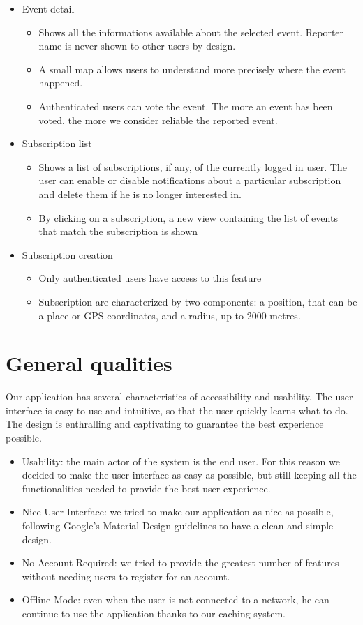 \documentclass[a4paper]{scrreprt}
\begin{document}
\begin{itemize}
\item Event detail
\begin{itemize}
\item Shows all the informations available about the selected event. Reporter name is never shown to other users by design.
\item A small map allows users to understand more precisely where the event happened.
\item Authenticated users can vote the event. The more an event has been voted, the more we consider reliable the reported event.
\end{itemize}

\item Subscription list
\begin{itemize}
\item Shows a list of subscriptions, if any, of the currently logged in user. The user can enable or disable notifications about a particular subscription and delete them if he is no longer interested in.
\item By clicking on a subscription, a new view containing the list of events that match the subscription is shown
\end{itemize}

\item Subscription creation
\begin{itemize}
\item Only authenticated users have access to this feature
\item Subscription are characterized by two components: a position, that can be a place or GPS coordinates, and a radius, up to 2000 metres.
\end{itemize}

\end{itemize}

\section{General qualities}
Our application has several characteristics of accessibility and usability. The user interface is easy to use and intuitive, so that the user quickly learns what to do. The design is enthralling and captivating to guarantee the best experience possible.
\begin{itemize}
\item Usability: the main actor of the system is the end user. For this reason we decided to make the user interface as easy as possible, but still keeping all the functionalities needed to provide the best user experience.
\item Nice User Interface: we tried to make our application as nice as possible, following Google's Material Design guidelines to have a clean and simple design.
\item No Account Required: we tried to provide the greatest number of features without needing users to register for an account.
\item Offline Mode: even when the user is not connected to a network, he can continue to use the application thanks to our caching system.
\end{itemize}
\end{document}
